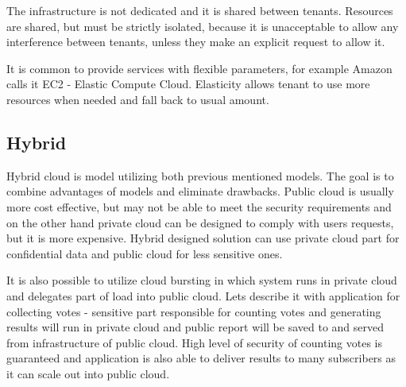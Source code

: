 The infrastructure is not dedicated and it is shared between tenants. Resources are shared, but must be strictly isolated, because it is unacceptable to allow any interference between tenants, unless they make an explicit request to allow it.

It is common to provide services with flexible parameters, for example Amazon calls it EC2 - Elastic Compute Cloud. Elasticity allows tenant to use more resources when needed and fall back to usual amount. 

\subsection{Hybrid}
Hybrid cloud is model utilizing both previous mentioned models. The goal is to combine advantages of models and eliminate drawbacks. Public cloud is usually more cost effective, but may not be able to meet the security requirements and on the other hand private cloud can be designed to comply with users requests, but it is more expensive. Hybrid designed solution can use private cloud part for confidential data and public cloud for less sensitive ones. 

It is also possible to utilize cloud bursting in which system runs in private cloud and delegates part of load into public cloud. Lets describe it with application for collecting votes - sensitive part responsible for counting votes and generating results will run in private cloud and public report will be saved to and served from infrastructure of public cloud. High level of security of counting votes is guaranteed and application is also able to deliver results to many subscribers as it can scale out into public cloud.

